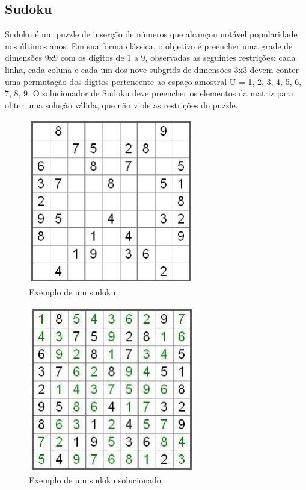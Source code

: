 \documentclass[twoside]{article}
\begin{document}
\begin{multicols}{2}
\subsection{Sudoku}
Sudoku é um puzzle de inserção de números que alcançou notável popularidade nos últimos anos. Em sua forma clássica, o objetivo é preencher uma grade de dimensões 9x9 com os dígitos de 1 a 9, observadas as seguintes restrições: cada linha, cada coluna e cada um dos nove subgrids de dimensões 3x3 devem conter uma permutação dos dígitos pertencente ao espaço amostral U = {1, 2, 3, 4, 5, 6, 7, 8, 9}. O solucionador de Sudoku deve preencher os elementos da matriz para obter uma solução válida, que não viole as restrições do puzzle.

\begin{figure}[H]
  \caption{Exemplo de um sudoku.}
  \centering
    \includegraphics[scale = 0.8]{sudoku_example1a.png}
\end{figure}

\begin{figure}[H]
  \caption{Exemplo de um sudoku solucionado.}
  \centering
    \includegraphics[scale = 0.8]{sudoku_example1b.png}
\end{figure}



\end{multicols}
\end{document}
